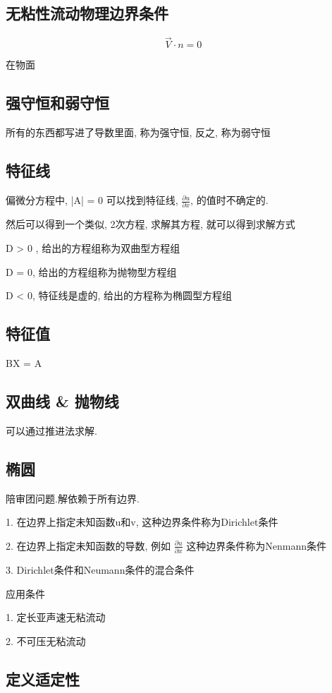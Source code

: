 \documentclass[UTF8]{ctexart}
\begin{document}
\subsection{无粘性流动物理边界条件}
$$
	\vec{V} \cdot n = 0
$$

在物面

\subsection{强守恒和弱守恒}

所有的东西都写进了导数里面, 称为强守恒, 反之, 称为弱守恒

\subsection{特征线}
偏微分方程中, |A| = 0 可以找到特征线, $\frac{\partial u}{\partial x}$, 的值时不确定的.

然后可以得到一个类似, 2次方程, 求解其方程, 就可以得到求解方式

D > 0 , 给出的方程组称为双曲型方程组

D = 0, 给出的方程组称为抛物型方程组

D < 0, 特征线是虚的, 给出的方程称为椭圆型方程组

\subsection{特征值}
BX = A

\subsection{双曲线 \& 抛物线}

可以通过推进法求解.

\subsection{椭圆}

陪审团问题.解依赖于所有边界.

1. 在边界上指定未知函数u和v, 这种边界条件称为Dirichlet条件

2. 在边界上指定未知函数的导数, 例如 $\frac{\partial u}{\partial x}$ 这种边界条件称为Nenmann条件

3. Dirichlet条件和Neumann条件的混合条件

应用条件

1. 定长亚声速无粘流动

2. 不可压无粘流动

\subsection{定义适定性}
\end{document}
